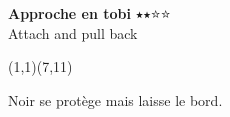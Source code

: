 \documentclass[preview, border=0pt, varwidth=false]{standalone}
\begin{document}
	\setgounit{0.4cm} 
	
\parbox[c][14.65cm][c]{10.2cm}{
	\centering
	
	{\Large\textbf{Approche en tobi} $\medblackstar \medblackstar \medwhitestar \medwhitestar$ \\ Attach and pull back}
	\vspace{3em}
	
	\begin{psgopartialboard}{(1,1)(7,11)}
		\pass
	\end{psgopartialboard}
	
	\vspace{1em}
	Noir se protège mais laisse le bord. 
}
\end{document}
